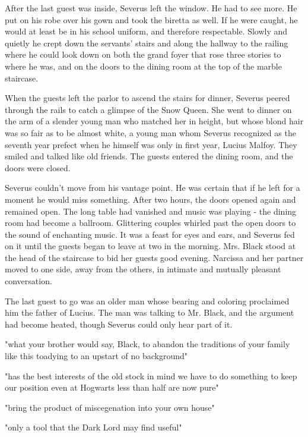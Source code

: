 After the last guest was inside, Severus left the window. He had to see more. He put on his robe over his gown and took the biretta as well. If he were caught, he would at least be in his school uniform, and therefore respectable. Slowly and quietly he crept down the servants' stairs and along the hallway to the railing where he could look down on both the grand foyer that rose three stories to where he was, and on the doors to the dining room at the top of the marble staircase.

When the guests left the parlor to ascend the stairs for dinner, Severus peered through the rails to catch a glimpse of the Snow Queen. She went to dinner on the arm of a slender young man who matched her in height, but whose blond hair was so fair as to be almost white, a young man whom Severus recognized as the seventh year prefect when he himself was only in first year, Lucius Malfoy. They smiled and talked like old friends. The guests entered the dining room, and the doors were closed.

Severus couldn't move from his vantage point. He was certain that if he left for a moment he would miss something. After two hours, the doors opened again and remained open. The long table had vanished and music was playing - the dining room had become a ballroom. Glittering couples whirled past the open doors to the sound of enchanting music. It was a feast for eyes and ears, and Severus fed on it until the guests began to leave at two in the morning. Mrs. Black stood at the head of the staircase to bid her guests good evening. Narcissa and her partner moved to one side, away from the others, in intimate and mutually pleasant conversation.

The last guest to go was an older man whose bearing and coloring proclaimed him the father of Lucius. The man was talking to Mr. Black, and the argument had become heated, though Severus could only hear part of it.

"{\el}what your brother would say, Black, to abandon the traditions of your family like this{\el} toadying to an upstart of no background{\el}"

"{\el}has the best interests of the old stock in mind{\el} we have to do something to keep our position{\el} even at Hogwarts less than half are now pure{\el}"

"{\el}bring the product of miscegenation into your own house{\el}"

"{\el}only a tool that the Dark Lord may find useful{\el}"

